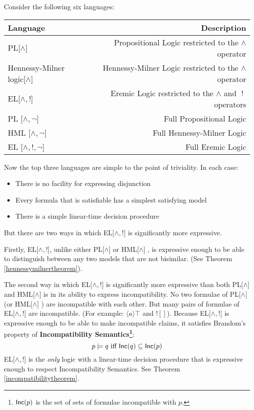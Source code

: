 
Consider the following six languages:
\begin{center}
\begin{tabular}{ l | r }
Language & Description \\
\hline
PL[$\land$] & Propositional Logic restricted to the $\land$ operator \\
Hennessy-Milner logic[$\land$] & Hennessy-Milner Logic restricted to the $\land$ operator \\
EL[$\land, !$] & Eremic Logic restricted to the $\land$ and $\ ! \ $ operators \\
PL [$\land, \neg$] & Full Propositional Logic \\
HML [$\land, \neg$] & Full Hennessy-Milner Logic \\
EL [$\land, !, \neg$] & Full Eremic Logic \\
\end{tabular}
\end{center}
Now the top three languages are simple to the point of triviality. In each case:
\begin{itemize}
\item
There is no facility for expressing disjunction
\item
Every formula that is satisfiable has a simplest satisfying model
\item
There is a simple linear-time decision procedure
\end{itemize}
But there are two ways in which EL[$\land, !$]  is significantly more expressive.

Firstly, EL[$\land, !$], unlike either PL[$\land$] or HML[$\land$] , is expressive enough to be able to distinguish between any two models that are not bisimilar. (See Theorem \ref{hennessymilnertheorem}).

The second way in which EL[$\land, !$] is significantly more expressive than both PL[$\land$] and HML[$\land$] is in its ability to express incompatibility.
No two formulae of PL[$\land$] (or HML[$\land$] ) are incompatible with each other. 
But many pairs of formulae of EL[$\land, !$] are incompatible.
(For example: $\langle a \rangle \top$ and $! []$). 
Because EL[$\land, !$]  is expressive enough to be able to make incompatible claims, it satisfies Brandom's property of {\bf Incompatibility Semantics\footnote{$\mathsf{Inc}(p)$ is the set of sets of formulae incompatible with $p$.}}:
\[
p \models q \mbox{ iff } \mathsf{Inc}(q) \subseteq \mathsf{Inc}(p)
\]
EL[$\land, !$]  is the \emph{only} logic with a linear-time decision procedure that is expressive enough to respect Incompatibility Semantics. See Theorem \ref{incompatibilitytheorem}.

